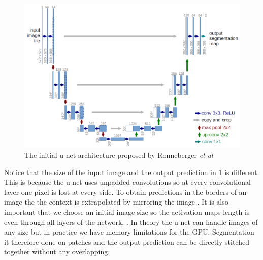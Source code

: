 \documentclass{kththesis}
\begin{document}
\begin{figure}[h!]
  \centering
      \includegraphics[scale=0.2]{u-net}
  \caption{The initial u-net architecture proposed by Ronneberger \textit{et al} \cite{ronneberger_u-net:_2015} \label{fig:unet}}
\end{figure}
Notice that the size of the input image and the output prediction in \ref{fig:unet} is different. This is because the u-net uses unpadded convolutions so at every convolutional layer one pixel is lost at every side. To obtain predictions in the borders of an image the the context is extrapolated by mirroring the image \parencite{li_deepunet:_2017}. It is also important that we choose an initial image size so the activation maps length is even through all layers of the network. \parencite{ronneberger_u-net:_2015}. In theory the u-net can handle images of any size but in practice we have memory limitations for the GPU. Segmentation it therefore done on patches and the output prediction can be directly stitched together without any overlapping.
\end{document}
